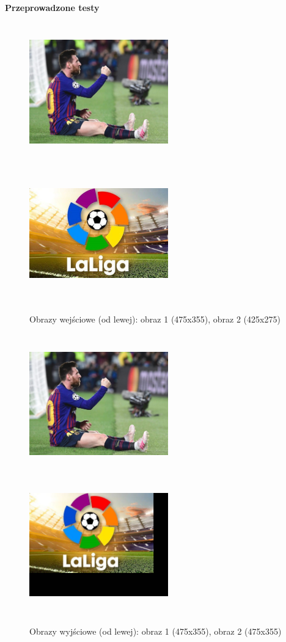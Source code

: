 \documentclass[magisterska,openany]{pracadypl}
\begin{document}
\newpage
\vspace{0.25cm}\textbf{\Large Przeprowadzone testy}
\vspace{0.5cm}
\begin{figure}[h]
\centering
\includegraphics[width=6cm, height=6cm]{orgi/RGBMessi.jpg}
\includegraphics[width=6cm, height=6cm]{orgi/RGBLL.jpg}
\caption{Obrazy wejściowe (od lewej): obraz 1 (475x355), obraz 2 (425x275) }
\end{figure}
\begin{figure}[h]
\centering
\includegraphics[width=6cm, height=6cm]{2_3/GeoRGB1.jpg}
\includegraphics[width=6cm, height=6cm]{2_3/GeoRGB2.jpg}
\caption{Obrazy wyjściowe (od lewej): obraz 1 (475x355), obraz 2 (475x355) }
\end{figure}
\end{document}
